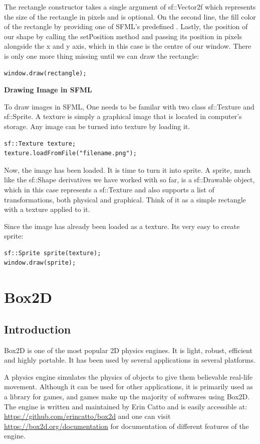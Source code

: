 \documentclass[main]{subfiles}
\begin{document}
The rectangle constructor takes a single argument of sf::Vector2f which represents
the size of the rectangle in pixels and is optional. On the second line,  the fill
color of the rectangle by providing one of SFML's predefined . Lastly,
the position of our shape by calling the setPosition method and passing its
position in pixels alongside the x and y axis, which in this case is the centre of our
window. There is only one more thing missing until we can draw the rectangle:

\begin{verbatim}
window.draw(rectangle); 
\end{verbatim}

\textbf{Drawing Image in SFML}

To draw images in SFML, One needs to be familar with two class sf::Texture and sf::Sprite. 
A texture is simply a graphical image that is located in computer's storage. Any image can be turned into texture by loading it. 
\begin{verbatim}
sf::Texture texture; 
texture.loadFromFile("filename.png"); 
\end{verbatim}

Now, the image has been loaded. It is time to turn it into sprite. A sprite, much like the sf::Shape derivatives we have worked with so far, is a sf::Drawable object, which in this case represents a sf::Texture and also supports a list of transformations, both physical and graphical. Think of it as a simple rectangle with a texture applied to it.\cite{Barbier(2015)} \cite{Pupius(2015)}

Since the image has already been loaded as a texture. Its very easy to create sprite:
\begin{verbatim}
sf::Sprite sprite(texture); 
window.draw(sprite); 
\end{verbatim}


\section{Box2D}
\subsection{Introduction}
Box2D is one of the most popular 2D physics engines. It is light, robust, efficient and highly portable. It has been used by several applications in several platforms.

A physics engine simulates the physics of objects to give them believable real-life movement. Although it can be used for other applications, it is primarily used as a library for games, and games make up the majority of softwares using Box2D. The engine is written and maintained by Erin Catto and is easily accessible at: \url{https://github.com/erincatto/box2d} and one can visit \url{https://box2d.org/documentation} for documentation of different features of the engine.
\end{document}
